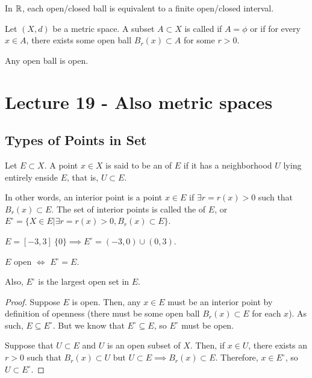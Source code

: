 \documentclass{book}
\begin{document}
In $\mathbb{R}$, each open/closed ball is equivalent to a finite open/closed interval.

\begin{defn}[Openness]
    Let $(X, d)$ be a metric space. A subset $A \subset X$ is called  if $A = \phi$ or if for every $x \in A$, there exists some open ball $B_r(x) \subset A$ for some $r > 0$.
\end{defn}

\begin{thm}
    Any open ball is open.
\end{thm}

\section{Lecture 19 - Also metric spaces}
\subsection{Types of Points in Set}
\begin{defn}
    Let $E \subset X$. A point $x \in X$ is said to be an  of $E$ if it has a neighborhood $U$ lying entirely enside $E$, that is, $U \subset E$.
\end{defn}

In other words, an interior point is a point $x \in E$ if $\exists r = r(x) > 0$ such that $B_r(x) \subset E$. The set of interior points is called the  of $E$, or $E^\circ = \{ X \in E | \exists r = r(x) > 0, B_r(x) \subset E\}$.

\begin{ex}
    $E = [-3, 3] \ \{0\} \implies E^\circ = (-3, 0) \cup (0, 3)$. 
\end{ex}

\begin{thm}
    $E$ open $\iff$ $E^\circ = E$.

    Also, $E^\circ$ is the largest open set in $E$.
\end{thm}

\begin{proof}
    Suppose $E$ is open. Then, any $x \in E$ must be an interior point by definition of openness (there must be some open ball $B_r(x) \subset E$ for each $x$). As such, $E \subseteq E^\circ$. But we know that $E^\circ \subseteq E$, so $E^\circ$ must be open.

    Suppose that $U \subset E$ and $U$ is an open subset of $X$. Then, if $x \in U$, there exists an $r > 0$ such that $B_r(x) \subset U$ but $U \subset E \implies B_r(x) \subset E$. Therefore, $x \in E^\circ$, so $U \subset E^\circ$. 
\end{proof}
\end{document}
